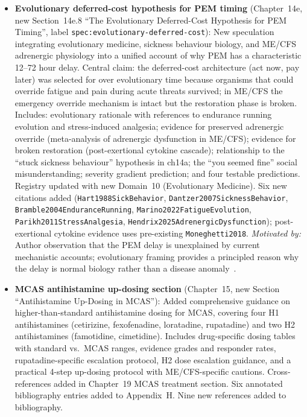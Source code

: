 \begin{itemize}
  \item \textbf{Evolutionary deferred-cost hypothesis for PEM timing}
    (Chapter~14e, new Section~14e.8 ``The Evolutionary Deferred-Cost Hypothesis
    for PEM Timing'', label \texttt{spec:evolutionary-deferred-cost}):
    New speculation integrating evolutionary medicine, sickness behaviour biology,
    and ME/CFS adrenergic physiology into a unified account of why PEM has a
    characteristic 12--72 hour delay. Central claim: the deferred-cost
    architecture (act now, pay later) was selected for over evolutionary time
    because organisms that could override fatigue and pain during acute threats
    survived; in ME/CFS the emergency override mechanism is intact but the
    restoration phase is broken. Includes: evolutionary rationale with references
    to endurance running evolution and stress-induced analgesia; evidence for
    preserved adrenergic override (meta-analysis of adrenergic dysfunction in
    ME/CFS); evidence for broken restoration (post-exertional cytokine cascade);
    relationship to the ``stuck sickness behaviour'' hypothesis in ch14a;
    the ``you seemed fine'' social misunderstanding; severity gradient prediction;
    and four testable predictions. Registry updated with new Domain~10
    (Evolutionary Medicine). Six new citations added
    (\texttt{Hart1988SickBehavior}, \texttt{Dantzer2007SicknessBehavior},
    \texttt{Bramble2004EnduranceRunning}, \texttt{Marino2022FatigueEvolution},
    \texttt{Parikh2011StressAnalgesia}, \texttt{Hendrix2025AdrenergicDysfunction});
    post-exertional cytokine evidence uses pre-existing \texttt{Moneghetti2018}.
    \textit{Motivated by:} Author observation that the PEM delay is unexplained
    by current mechanistic accounts; evolutionary framing provides a principled
    reason why the delay is normal biology rather than a disease
    anomaly~\cite{Hart1988SickBehavior,Dantzer2007SicknessBehavior,%
    Bramble2004EnduranceRunning,Marino2022FatigueEvolution,%
    Parikh2011StressAnalgesia,Che2025,Moneghetti2018,%
    Hendrix2025AdrenergicDysfunction}.

  \item \textbf{MCAS antihistamine up-dosing section}
    (Chapter~15, new Section ``Antihistamine Up-Dosing in MCAS''): Added
    comprehensive guidance on higher-than-standard antihistamine dosing for MCAS,
    covering four H1 antihistamines (cetirizine, fexofenadine, loratadine,
    rupatadine) and two H2 antihistamines (famotidine, cimetidine). Includes
    drug-specific dosing tables with standard vs.\ MCAS ranges, evidence grades
    and responder rates, rupatadine-specific escalation protocol, H2 dose
    escalation guidance, and a practical 4-step up-dosing protocol with
    ME/CFS-specific cautions. Cross-references added in Chapter~19 MCAS
    treatment section. Six annotated bibliography entries added to Appendix~H.
    Nine new references added to bibliography.


\end{itemize}
